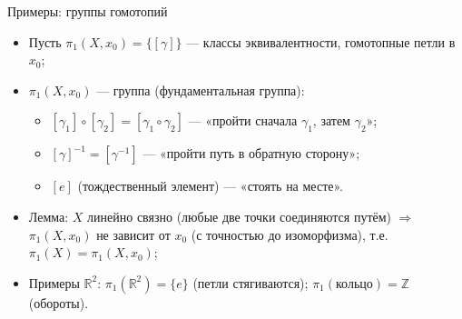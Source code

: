 \documentclass[serif, aspectratio=169]{beamer}
\begin{document}
\begin{frame}{Примеры: группы гомотопий}
\begin{itemize}
\begin{center}
        \end{center}
        \item Пусть $\pi_1(X,x_0)=\{[\gamma]\}$ --- классы эквивалентности, гомотопные петли в $x_0$;
        \item $\pi_1(X,x_0)$ --- группа (фундаментальная группа):
        \begin{itemize}
            \item $[\gamma_1]\circ[\gamma_2]=[\gamma_1\circ\gamma_2]$ --- «пройти сначала $\gamma_1$, затем $\gamma_2$»;
            \item $[\gamma]^{-1}=[\gamma^{-1}]$ --- «пройти путь в обратную сторону»;
            \item $[e]$ (тождественный элемент) --- «стоять на месте».
        \end{itemize}
        \item Лемма: $X$ линейно связно (любые две точки соединяются путём) $\Rightarrow$ $\pi_1(X,x_0)$ не зависит от $x_0$ (с точностью до изоморфизма), т.е. $\pi_1(X)=\pi_1(X,x_0)$;
        \item Примеры $\mathbb{R}^2$: $\pi_1(\mathbb{R}^2)=\{e\}$ (петли стягиваются); $\pi_1(\text{кольцо})=\mathbb{Z}$ (обороты).
    \end{itemize}
    \note{
        \begin{itemize}
            \item ---
        \end{itemize}
    }
\end{frame}
\end{document}
